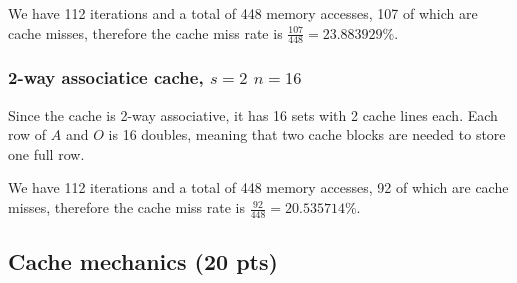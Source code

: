We have 112 iterations and a total of 448 memory accesses, 107 of which are cache misses, therefore the cache miss rate is $\frac{107}{448} = 23.883929\%$.\vspace*{-0.4cm}

\subsubsection{2-way associatice cache, $s=2$ $n=16$}
Since the cache is 2-way associative, it has 16 sets with 2 cache lines each. Each row of $A$ and $O$ is 16 doubles, meaning that two cache blocks are needed to store one full row.

We have 112 iterations and a total of 448 memory accesses, 92 of which are cache misses, therefore the cache miss rate is $\frac{92}{448} = 20.535714\%$.\vspace*{-0.4cm}


\subsection{Cache mechanics (20 pts)}
